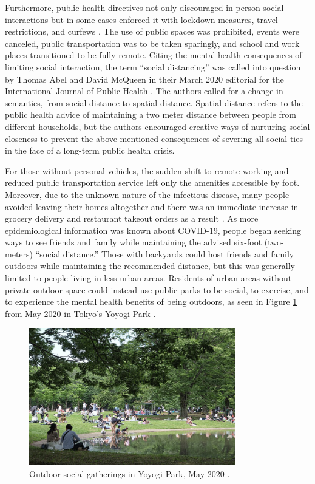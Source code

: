 \begin{multicols}{2}
Furthermore, public health directives not only discouraged in-person social interactions but in some cases enforced it with lockdown measures, travel restrictions, and curfews \cite{geng_impacts_2021}. The use of public spaces was prohibited, events were canceled, public transportation was to be taken sparingly, and school and work places transitioned to be fully remote. Citing the mental health consequences of limiting social interaction, the term “social distancing” was called into question by Thomas Abel and David McQueen in their March 2020 editorial for the International Journal of Public Health \cite{abel_covid-19_2020}. The authors called for a change in semantics, from social distance to spatial distance. Spatial distance refers to the public health advice of maintaining a two meter distance between people from different households, but the authors encouraged creative ways of nurturing social closeness to prevent the above-mentioned consequences of severing all social ties in the face of a long-term public health crisis.

For those without personal vehicles, the sudden shift to remote working and reduced public transportation service left only the amenities accessible by foot. Moreover, due to the unknown nature of the infectious disease, many people avoided leaving their homes altogether and there was an immediate increase in grocery delivery and restaurant takeout orders as a result \cite{wang_adoption_2021}. As more epidemiological information was known about COVID-19, people began seeking ways to see friends and family while maintaining the advised six-foot (two-meters) “social distance.” Those with backyards could host friends and family outdoors while maintaining the recommended distance, but this was generally limited to people living in less-urban areas. Residents of urban areas without private outdoor space could instead use public parks to be social, to exercise, and to experience the mental health benefits of being outdoors, as seen in Figure \ref{fig:yoyogi_park} from May 2020 in Tokyo's Yoyogi Park \cite{bereitschaft_how_2020}\cite{japan_yoyogi_2020}. 

\end{multicols}

 \begin{figure}[h!]
  \centering
  \includegraphics[width=0.8\textwidth]{images/introduction/yoyogi2.jpeg}
  \captionsetup{width=0.8\linewidth}
  \caption[Yoyogi Park]{Outdoor social gatherings in Yoyogi Park, May 2020 \cite{japan_yoyogi_2020}.}
  \label{fig:yoyogi_park}
\end{figure}

